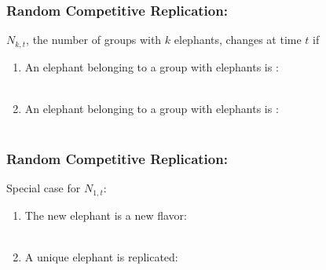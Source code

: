 \begin{frame}
  \frametitle{Random Competitive Replication:}

  \begin{block}{$N_{k,t}$, the number of groups with $k$ elephants, changes at time $t$ if}
    \begin{enumerate}
    \item<2-> An elephant belonging to a group with  elephants is :\\
      \\
      \bigskip
    \item<3-> An elephant belonging to a group with  elephants is :\\
      \\
    \end{enumerate}
  \end{block}

\end{frame}

\begin{frame}
  \frametitle{Random Competitive Replication:}

  \begin{block}{Special case for $N_{1,t}$:}
    \begin{enumerate}
    \item<2-> The new elephant is a new flavor:\\
      \\
      \bigskip
    \item<3-> A unique elephant is replicated:\\
      \\
    \end{enumerate}
  \end{block}

\end{frame}

